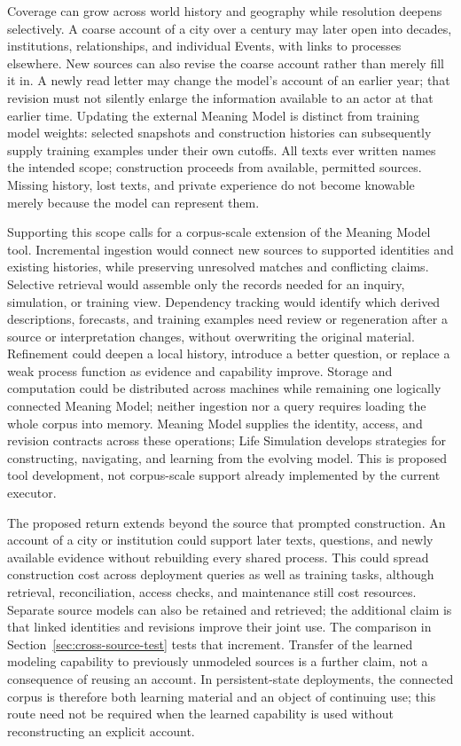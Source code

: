 \documentclass[10pt]{article}
\begin{document}
Coverage can grow across world history and geography while resolution deepens
selectively. A coarse account of a city over a century may later open into
decades, institutions, relationships, and individual Events, with links to
processes elsewhere. New sources can also revise the coarse account rather
than merely fill it in. A newly read letter may change the model's account of
an earlier year; that revision must not silently enlarge the information
available to an actor at that earlier time. Updating the external Meaning Model is distinct from
training model weights: selected snapshots and construction histories can
subsequently supply training examples under their own cutoffs. All texts ever
written names the intended scope; construction proceeds from available,
permitted sources. Missing history, lost texts, and private experience do not
become knowable merely because the model can represent them.

Supporting this scope calls for a corpus-scale extension of the Meaning Model
tool. Incremental ingestion would connect new sources to supported identities
and existing histories, while preserving unresolved matches and conflicting
claims. Selective retrieval would assemble only the records needed for an
inquiry, simulation, or training view. Dependency tracking would identify which
derived descriptions, forecasts, and training examples need review or
regeneration after a source or interpretation changes, without overwriting
the original material. Refinement could deepen a local history, introduce a
better question, or replace a weak process function as evidence and capability
improve. Storage and computation could be distributed across machines while
remaining one logically connected Meaning Model; neither ingestion nor a
query requires loading the whole corpus into memory. Meaning Model supplies
the identity, access, and revision contracts across these operations; Life
Simulation develops strategies for constructing, navigating, and learning
from the evolving model. This is proposed tool development, not corpus-scale
support already implemented by the current executor.

The proposed return extends beyond the source that prompted construction. An
account of a city or institution could support later texts, questions, and
newly available evidence without rebuilding every shared process. This could
spread construction cost across deployment queries as well as training tasks,
although retrieval, reconciliation, access checks, and maintenance still cost
resources. Separate source models can also be retained and retrieved; the
additional claim is that linked identities and revisions improve their joint
use. The comparison in Section~\ref{sec:cross-source-test} tests that increment.
Transfer of the learned modeling capability to previously unmodeled sources is
a further claim, not a consequence of reusing an account. In persistent-state
deployments, the connected corpus is therefore both learning material and an
object of continuing use; this route need not be required when the learned
capability is used without reconstructing an explicit account.
\end{document}
